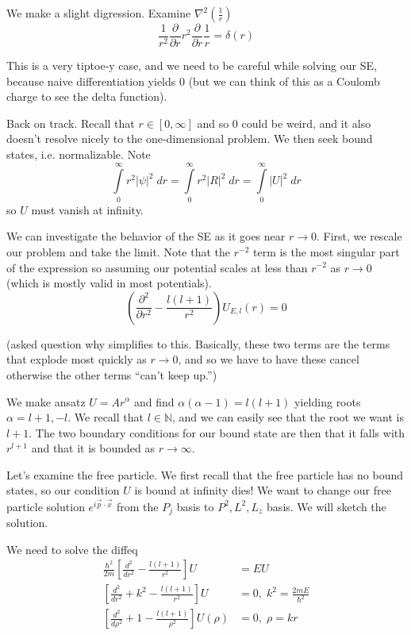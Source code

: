 \documentclass[10pt]{report}
\newcommand{\pd}[2]{\frac{\partial #1}{\partial#2}}
\newcommand{\abs}[1]{\left|#1\right|}
\newcommand{\rtd}[2]{\frac{d^2#1}{d#2^2}}
\newcommand{\ptd}[2]{\frac{\partial^2 #1}{\partial#2^2}}
\begin{document}
We make a slight digression. Examine $\nabla^2 \left( \frac{1}{r} \right)$
$$\frac{1}{r^2}\pd{}{r}r^2\pd{}{r}\frac{1}{r} = \delta(r)$$

This is a very tiptoe-y case, and we need to be careful while solving our SE, because naive differentiation yields $0$ (but we can think of this as a Coulomb charge to see the delta function).

Back on track. Recall that $r \in \left[ 0,\infty \right]$ and so $0$ could be weird, and it also doesn't resolve nicely to the one-dimensional problem. We then seek bound states, i.e. normalizable. Note
$$\displaystyle\int\limits_{0}^{\infty} r^2 \abs{\psi}^2\;dr = \displaystyle\int\limits_{0}^{\infty}r^2 \abs{R}^2\;dr = \displaystyle\int\limits_{0}^{\infty}\abs{U}^2\;dr$$
so $U$ must vanish at infinity. 

We can investigate the behavior of the SE as it goes near $r \to 0$. First, we rescale our problem and take the limit. Note that the $r^{-2}$ term is the most singular part of the expression so assuming our potential scales at less than $r^{-2}$ as $r \to 0$ (which is mostly valid in most potentials). 
$$\left( \ptd{}{r} - \frac{l(l+1)}{r^2} \right) U_{E,l}(r) = 0$$

(asked question why simplifies to this. Basically, these two terms are the terms that explode most quickly as $r \to 0$, and so we have to have these cancel otherwise the other terms ``can't keep up.'')

We make ansatz $U = Ar^\alpha$ and find $\alpha(\alpha-1) = l(l+1)$ yielding roots $\alpha = l+1, -l$. We recall that $l \in \mathbb{N}$, and we can easily see that the root we want is $l+1$. The two boundary conditions for our bound state are then that it falls with $r^{l+1}$ and that it is bounded as $ r \to \infty$. 

Let's examine the free particle. We first recall that the free particle has no bound states, so our condition $U$ is bound at infinity dies! We want to change our free particle solution $e^{i\vec{p}\cdot \vec{x}}$ from the $P_j$ basis to $P^2, L^2, L_z$ basis. We will sketch the solution.

We need to solve the diffeq
\begin{align}
    \frac{\hbar^2}{2m}\left[ \rtd{}{r} - \frac{l(l+1)}{r^2} \right]U &= EU\\
    \left[ \rtd{}{r} + k^2 - \frac{l(l+1)}{r^2} \right]U &= 0, \; k^2 = \frac{2mE}{\hbar^2}\\
    \left[ \rtd{}{\rho} + 1 - \frac{l(l+1)}{\rho^2} \right]U(\rho) &= 0, \; \rho = kr
\end{align}
\end{document}
